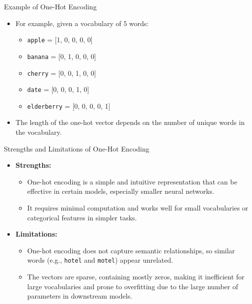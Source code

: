 \documentclass[serif, aspectratio=169]{beamer}
\begin{document}
\begin{frame}{Example of One-Hot Encoding}
	\begin{itemize}
		\item For example, given a vocabulary of 5 words:
		\begin{itemize}
			\item \texttt{apple} = [1, 0, 0, 0, 0]
			\item \texttt{banana} = [0, 1, 0, 0, 0]
			\item \texttt{cherry} = [0, 0, 1, 0, 0]
			\item \texttt{date} = [0, 0, 0, 1, 0]
			\item \texttt{elderberry} = [0, 0, 0, 0, 1]
		\end{itemize}
		\item The length of the one-hot vector depends on the number of unique words in the vocabulary.
	\end{itemize}
\end{frame}

\begin{frame}{Strengths and Limitations of One-Hot Encoding}
	\begin{itemize}
		\item \textbf{Strengths:}
		\begin{itemize}
			\item One-hot encoding is a simple and intuitive representation that can be effective in certain models, especially smaller neural networks.
			\item It requires minimal computation and works well for small vocabularies or categorical features in simpler tasks.
		\end{itemize}
		\item \textbf{Limitations:}
		\begin{itemize}
			\item One-hot encoding does not capture semantic relationships, so similar words (e.g., \texttt{hotel} and \texttt{motel}) appear unrelated.
			\item The vectors are sparse, containing mostly zeros, making it inefficient for large vocabularies and prone to overfitting due to the large number of parameters in downstream models.
		\end{itemize}
	\end{itemize}
\end{frame}
\end{document}
